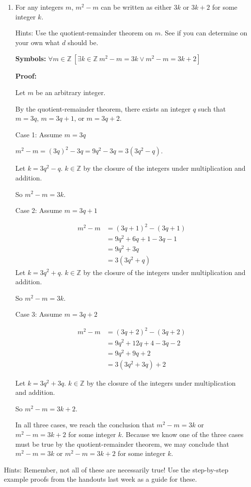 \documentclass[12pt, letterpaper]{report}
\newcommand{\Z}{\mathbb{Z}}
\newcommand{\indentpar}{\addtolength{\leftskip}{5mm}}
\newcommand{\stopindentpar}{\addtolength{\leftskip}{-5mm}}
\begin{document}
\begin{enumerate}
        
        
        \item For any integers $m$, $m^2-m$ can be written as either $3k$ or $3k+2$ for some integer $k$.
        
        Hints:  Use the quotient-remainder theorem on $m$.  See if you can determine on your own what $d$ should be.          

                
\textbf{Symbols: } $\forall m \in \Z \  [\exists k \in \Z \ m^2-m=3k \lor m^2-m=3k+2]$

\textbf{Proof:}

Let $m$ be an arbitrary integer.

By the quotient-remainder theorem, there exists an integer $q$ such that $m=3q$, $m=3q+1$,
or $m=3q+2$.

Case 1: Assume $m=3q$

\indentpar

$m^2-m = (3q)^2-3q = 9q^2 - 3q = 3(3q^2-q)$.

Let $k=3q^2-q$.  $k\in \Z$ by the closure of the integers under multiplication and addition.

So $m^2-m=3k$.

\stopindentpar

Case 2: Assume $m=3q+1$

\indentpar
\begin{align*}
m^2-m &= (3q+1)^2 - (3q+1) \\ 
&= 9q^2 + 6q + 1 -3q -1 \\&= 9q^2 +3q \\&= 3(3q^2+q)
\end{align*}
Let $k=3q^2+q$.  $k\in \Z$ by the closure of the integers under multiplication and addition.

So $m^2-m=3k$.

\stopindentpar

Case 3: Assume $m=3q+2$

\indentpar

\begin{align*}
m^2-m &= (3q+2)^2 - (3q+2) \\ 
&= 9q^2 + 12q + 4 -3q -2 \\&= 9q^2 +9q+2 \\&= 3(3q^2+3q)+2
\end{align*}

Let $k=3q^2+3q$.  $k\in \Z$ by the closure of the integers under multiplication and addition.

So $m^2-m=3k+2$.

\stopindentpar

In all three cases, we reach the conclusion that $m^2-m=3k$ or $m^2-m=3k+2$ for some integer
$k$.  Because we know one of the three cases must be true by the quotient-remainder 
theorem, we may conclude that $m^2-m=3k$ or $m^2-m=3k+2$ for some integer
$k$. 

\end{enumerate}
Hints: Remember, not all of these are necessarily true!  Use the step-by-step example proofs from the handouts last week
as a guide for these.
 
\end{document}
